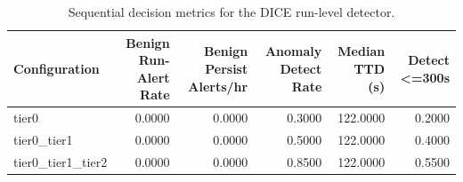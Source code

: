 \begin{table}[t]
\centering
\caption{Sequential decision metrics for the DICE run-level detector.}
\label{tab:dice_sequential_metrics}
\footnotesize
\begin{tabular}{lrrrrr}
\toprule
Configuration & Benign Run-Alert Rate & Benign Persist Alerts/hr & Anomaly Detect Rate & Median TTD (s) & Detect <=300s \\
\midrule
tier0 & 0.0000 & 0.0000 & 0.3000 & 122.0000 & 0.2000 \\
tier0_tier1 & 0.0000 & 0.0000 & 0.5000 & 122.0000 & 0.4000 \\
tier0_tier1_tier2 & 0.0000 & 0.0000 & 0.8500 & 122.0000 & 0.5500 \\
\bottomrule
\end{tabular}

\end{table}
